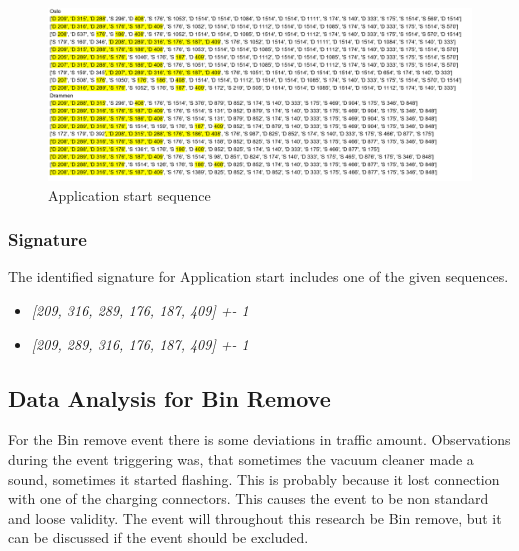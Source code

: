 \begin{figure}[H]
    \centering
    \includegraphics[width=\textwidth]{figures/Sequence_AS.png}
    \caption{Application start sequence}
    \label{fig:ASseq}
\end{figure}

\subsubsection{Signature}
The identified signature for Application start includes one of the given sequences.
\begin{itemize}
    \item \textit{[209, 316, 289, 176, 187, 409] +- 1}
    \item \textit{[209, 289, 316, 176, 187, 409] +- 1}
\end{itemize}


\subsection{Data Analysis for Bin Remove}
For the Bin remove event there is some deviations in traffic amount. Observations during the event triggering was, that sometimes the vacuum cleaner made a sound, sometimes it started flashing. This is probably because it lost connection with one of the charging connectors. This causes the event to be non standard and loose validity. The event will throughout this research be Bin remove, but it can be discussed if the event should be excluded.

